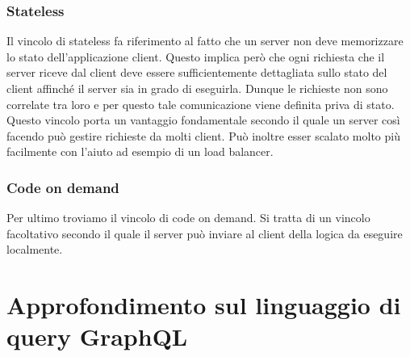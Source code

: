 \subsubsection{Stateless}
Il vincolo di stateless fa riferimento al fatto che un server non deve memorizzare lo stato dell'applicazione client. Questo implica però che ogni richiesta che il server riceve dal client deve essere sufficientemente dettagliata sullo stato del client affinché il server sia in grado di eseguirla. Dunque le richieste non sono correlate tra loro e per questo tale comunicazione viene definita priva di stato. \\
Questo vincolo porta un vantaggio fondamentale secondo il quale un server così facendo può gestire richieste da molti client. Può inoltre esser scalato molto più facilmente con l'aiuto ad esempio di un load balancer.
\subsubsection{Code on demand}
Per ultimo troviamo il vincolo di code on demand. Si tratta di un vincolo facoltativo secondo il quale il server può inviare al client della logica da eseguire localmente.
\section{Approfondimento sul linguaggio di query GraphQL}
